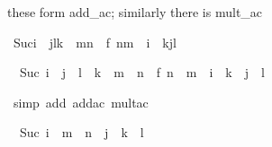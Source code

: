\begin{isabellebody}
\begin{isamarkuptext}
these form add_ac; similarly there is mult_ac%
\end{isamarkuptext}%
\isamarkuptrue%
\isamarkupfalse%
\ {}Suc{}i\ {}\ j{}l{}k\ {}\ m{}n{}\ {}\ f\ {}n{}m\ {}\ i\ {}\ k{}j{}l{}{}%
\isadelimproof
%
\endisadelimproof
%
\isatagproof
%
\begin{isamarkuptxt}%
\begin{isabelle}%
\ {}{}\ Suc\ {}i\ {}\ j\ {}\ l\ {}\ k\ {}\ m\ {}\ n{}\ {}\ f\ {}n\ {}\ m\ {}\ i\ {}\ k\ {}\ j\ {}\ l{}%
\end{isabelle}%
\end{isamarkuptxt}%
\isamarkuptrue%
\isamarkupfalse%
\ {}simp\ add{}\ add{}ac\ mult{}ac{}%
\begin{isamarkuptxt}%
\begin{isabelle}%
\ {}{}\ Suc\ {}i\ {}\ {}m\ {}\ n\ {}\ j\ {}\ {}k\ {}\ l{}{}{}\ {}\isanewline

\end{isabelle}
\end{isamarkuptxt}
\end{isabellebody}
